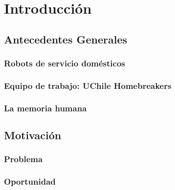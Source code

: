\chapter{Introducción}\label{chapter:introduction}


\section{Antecedentes Generales}


\subsection{Robots de servicio domésticos}

\subsection{Equipo de trabajo: UChile Homebreakers}

\subsection{La memoria humana}


\section{Motivación}


\subsection{Problema}

\subsection{Oportunidad}


